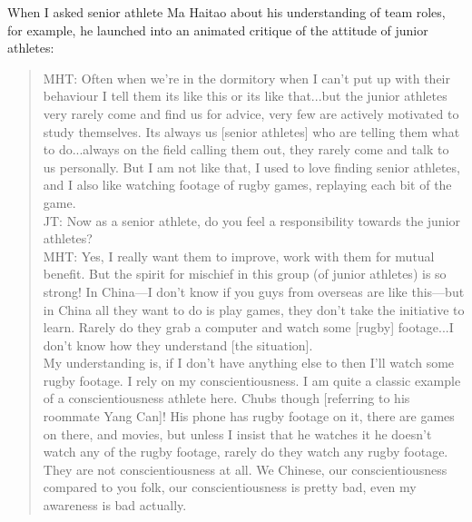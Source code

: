 \begin{CJK}{UTF8}{gbsn}




When I asked senior athlete Ma Haitao about his understanding of team roles, for example, he launched into an animated critique of the attitude of junior athletes:

  \begin{quote}
    MHT: Often when we're in the dormitory when I can't put up with their behaviour I tell them its like this or its like that...but the junior athletes very rarely come and find us for advice, very few are actively motivated to study themselves. Its always us [senior athletes] who are telling them what to do...always on the field calling them out, they rarely come and talk to us personally.  But I am not like that, I used to love finding senior athletes, and I also like watching footage of rugby games, replaying each bit of the game.\\
    JT: Now as a senior athlete, do you feel a responsibility towards the junior athletes?\\
    MHT: Yes, I really want them to improve, work with them for mutual benefit.  But the spirit for mischief in this group (of junior athletes) is so strong! In China---I don't know if you guys from overseas are like this---but in China all they want to do is play games, they don't take the initiative to learn.  Rarely do they grab a computer and watch some [rugby] footage...I don’t know how they understand [the situation].
\\
    My understanding is, if I don’t have anything else to then I’ll watch some rugby footage. I rely on my conscientiousness.  I am quite a classic example of a conscientiousness athlete here.  Chubs though [referring to his roommate Yang Can]!  His phone has rugby footage on it, there are games on there, and movies, but unless I insist that he watches it he doesn't watch any of the rugby footage, rarely do they watch any rugby footage.  They are not conscientiousness at all. We Chinese, our conscientiousness compared to you folk, our conscientiousness is pretty bad, even my awareness is bad actually.
  \end{quote}


\end{CJK}
